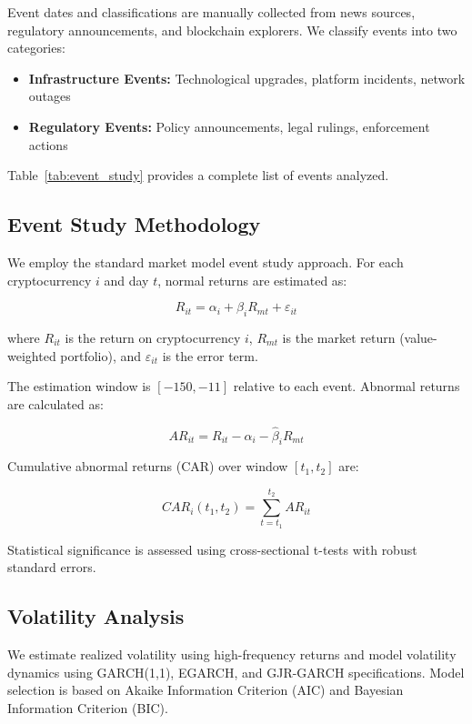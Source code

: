 \documentclass[12pt]{article}
\begin{document}
Event dates and classifications are manually collected from news sources, regulatory announcements, and blockchain explorers. We classify events into two categories:

\begin{itemize}
    \item \textbf{Infrastructure Events:} Technological upgrades, platform incidents, network outages
    \item \textbf{Regulatory Events:} Policy announcements, legal rulings, enforcement actions
\end{itemize}

Table~\ref{tab:event_study} provides a complete list of events analyzed.

\subsection{Event Study Methodology}

We employ the standard market model event study approach. For each cryptocurrency $i$ and day $t$, normal returns are estimated as:

\begin{equation}
    R_{it} = \alpha_i + \beta_i R_{mt} + \varepsilon_{it}
\end{equation}

where $R_{it}$ is the return on cryptocurrency $i$, $R_{mt}$ is the market return (value-weighted portfolio), and $\varepsilon_{it}$ is the error term.

The estimation window is $[-150, -11]$ relative to each event. Abnormal returns are calculated as:

\begin{equation}
    AR_{it} = R_{it} - \hat{\alpha}_i - \hat{\beta}_i R_{mt}
\end{equation}

Cumulative abnormal returns (CAR) over window $[t_1, t_2]$ are:

\begin{equation}
    CAR_i(t_1, t_2) = \sum_{t=t_1}^{t_2} AR_{it}
\end{equation}

Statistical significance is assessed using cross-sectional t-tests with robust standard errors.

\subsection{Volatility Analysis}

We estimate realized volatility using high-frequency returns and model volatility dynamics using GARCH(1,1), EGARCH, and GJR-GARCH specifications. Model selection is based on Akaike Information Criterion (AIC) and Bayesian Information Criterion (BIC).
\end{document}
